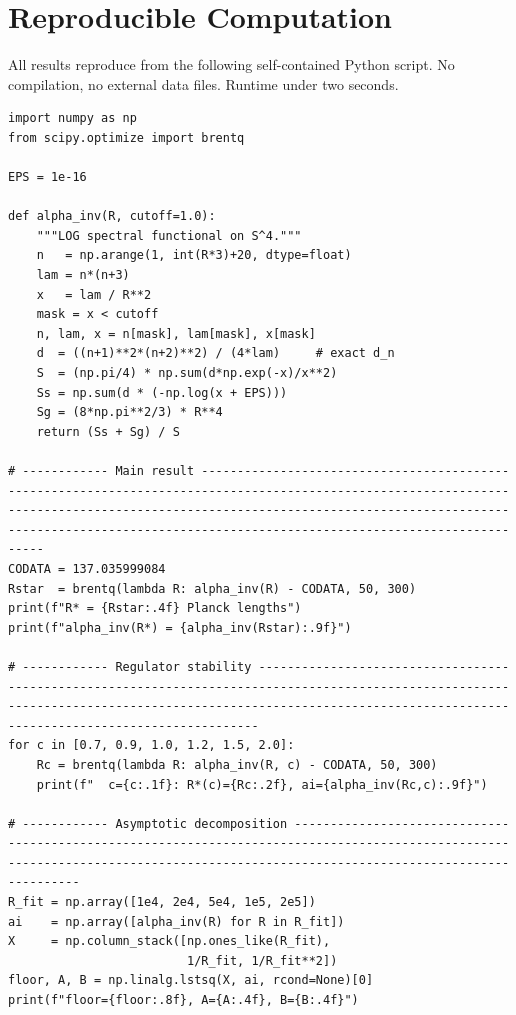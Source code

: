 \documentclass[12pt,a4paper]{article}
\begin{document}
\section{Reproducible Computation}
\label{sec:code}

All results reproduce from the following
self-contained Python script.
No compilation, no external data files.
Runtime under two seconds.

\begin{verbatim}
import numpy as np
from scipy.optimize import brentq

EPS = 1e-16

def alpha_inv(R, cutoff=1.0):
    """LOG spectral functional on S^4."""
    n   = np.arange(1, int(R*3)+20, dtype=float)
    lam = n*(n+3)
    x   = lam / R**2
    mask = x < cutoff
    n, lam, x = n[mask], lam[mask], x[mask]
    d  = ((n+1)**2*(n+2)**2) / (4*lam)     # exact d_n
    S  = (np.pi/4) * np.sum(d*np.exp(-x)/x**2)
    Ss = np.sum(d * (-np.log(x + EPS)))
    Sg = (8*np.pi**2/3) * R**4
    return (Ss + Sg) / S

# ------------ Main result ------------------------------------------------------------------------------------------------------------------------------------------------------------------------------------------------------------------------------------------------------------------
CODATA = 137.035999084
Rstar  = brentq(lambda R: alpha_inv(R) - CODATA, 50, 300)
print(f"R* = {Rstar:.4f} Planck lengths")
print(f"alpha_inv(R*) = {alpha_inv(Rstar):.9f}")

# ------------ Regulator stability ------------------------------------------------------------------------------------------------------------------------------------------------------------------------------------------------------------------
for c in [0.7, 0.9, 1.0, 1.2, 1.5, 2.0]:
    Rc = brentq(lambda R: alpha_inv(R, c) - CODATA, 50, 300)
    print(f"  c={c:.1f}: R*(c)={Rc:.2f}, ai={alpha_inv(Rc,c):.9f}")

# ------------ Asymptotic decomposition ------------------------------------------------------------------------------------------------------------------------------------------------------------------------------------
R_fit = np.array([1e4, 2e4, 5e4, 1e5, 2e5])
ai    = np.array([alpha_inv(R) for R in R_fit])
X     = np.column_stack([np.ones_like(R_fit),
                         1/R_fit, 1/R_fit**2])
floor, A, B = np.linalg.lstsq(X, ai, rcond=None)[0]
print(f"floor={floor:.8f}, A={A:.4f}, B={B:.4f}")
\end{verbatim}
\end{document}
